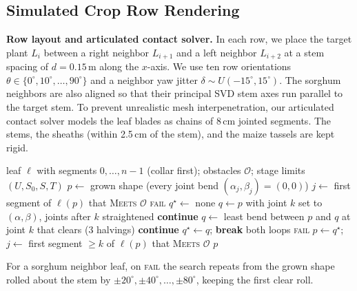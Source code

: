 \documentclass[10pt,twocolumn,letterpaper]{article}
\newcommand{\Meets}{\textsc{Meets}}
\begin{document}
\subsection{Simulated Crop Row Rendering}
\noindent\textbf{Row layout and articulated contact solver.}
In each row, we place the target plant $L_i$ between a right neighbor $L_{i+1}$ and a left neighbor $L_{i+2}$ at a stem spacing of $d = 0.15$\,m along the $x$-axis. We use ten row orientations $\theta \in \{0^\circ, 10^\circ, \dots, 90^\circ\}$ and a neighbor yaw jitter $\delta \sim U(-15^\circ, 15^\circ)$. The sorghum neighbors are also aligned so that their principal SVD stem axes run parallel to the target stem. To prevent unrealistic mesh interpenetration, our articulated contact solver models the leaf blades as chains of 8\,cm jointed segments. The stems, the sheaths (within 2.5\,cm of the stem), and the maize tassels are kept rigid.


\begin{algorithm}[t]
\caption{\textsc{BendClear}: Minimum-deviation collision-free leaf shape}\label{alg:supp-bend}
\footnotesize
\begin{algorithmic}[1]
\Require leaf $\ell$ with segments $0,\dots,n{-}1$ (collar first); obstacles $\mathcal O$; stage limits $(U,S_0,S,T)$
\State $p \gets$ grown shape (every joint bend $(\alpha_j,\beta_j)=(0,0)$)
\State $j \gets$ first segment of $\ell(p)$ that \Meets{} $\mathcal O$ 
   \Return \textsc{fail} \EndIf
  \State $q^\star \gets$ none
   
      \State $q \gets p$ with joint $k$ set to $(\alpha,\beta)$, joints after $k$ straightened
      \If{$\sum_i \|(\alpha_i,\beta_i)\| > T$ \textbf{or} segs.\ $k..j$ of $\ell(q)$ \Meets{} $\mathcal O$}
        \State \textbf{continue}
      \EndIf
      \State $q \gets$ least bend between $p$ and $q$ at joint $k$ that clears (3 halvings)
        \State \textbf{continue}
      \EndIf
      \State $q^\star \gets q$; \textbf{break} both loops
    \EndFor
  \EndFor
   \Return \textsc{fail} \EndIf
  \State $p \gets q^\star$; \quad $j \gets$ first segment $\ge k$ of $\ell(p)$ that \Meets{} $\mathcal O$
\EndWhile
\State \Return $p$
\end{algorithmic}
\noindent\footnotesize For a sorghum neighbor leaf, on \textsc{fail} the search repeats from the grown shape rolled about the stem by $\pm20^\circ,\pm40^\circ,\dots,\pm80^\circ$, keeping the first clear roll.
\end{algorithm}
\end{document}
